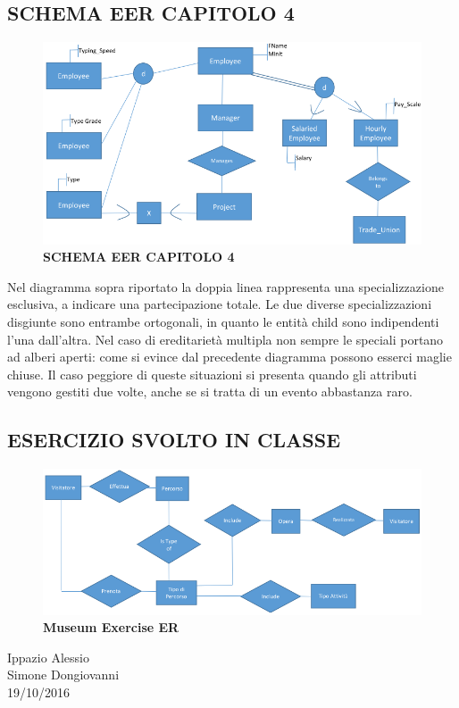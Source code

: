 \subsection{SCHEMA EER CAPITOLO 4} 

\begin{center}
\begin{figure}[H]
\centering
\includegraphics[scale=0.7]{figures/EERschema_cpt4.png}
\caption{\textbf{SCHEMA EER CAPITOLO 4}}
\end{figure}
\end{center}

Nel diagramma sopra riportato la doppia linea rappresenta una specializzazione esclusiva, a indicare una partecipazione totale.  Le due diverse specializzazioni disgiunte sono entrambe ortogonali, in quanto le entità child sono indipendenti l’una dall’altra. Nel caso di ereditarietà multipla non sempre le speciali portano ad alberi aperti: come si evince dal precedente diagramma possono esserci maglie chiuse. Il caso peggiore di queste situazioni si presenta quando gli attributi vengono gestiti due volte, anche se si tratta di un evento abbastanza raro.


\subsection{ESERCIZIO SVOLTO IN CLASSE}

\begin{center}
\begin{figure}[H]
\centering
\includegraphics[scale=0.7]{figures/museum.png}
\caption{\textbf{Museum Exercise ER}}
\end{figure}
\end{center}


\begin{flushright}Ippazio Alessio\\Simone Dongiovanni\\19/10/2016\end{flushright}